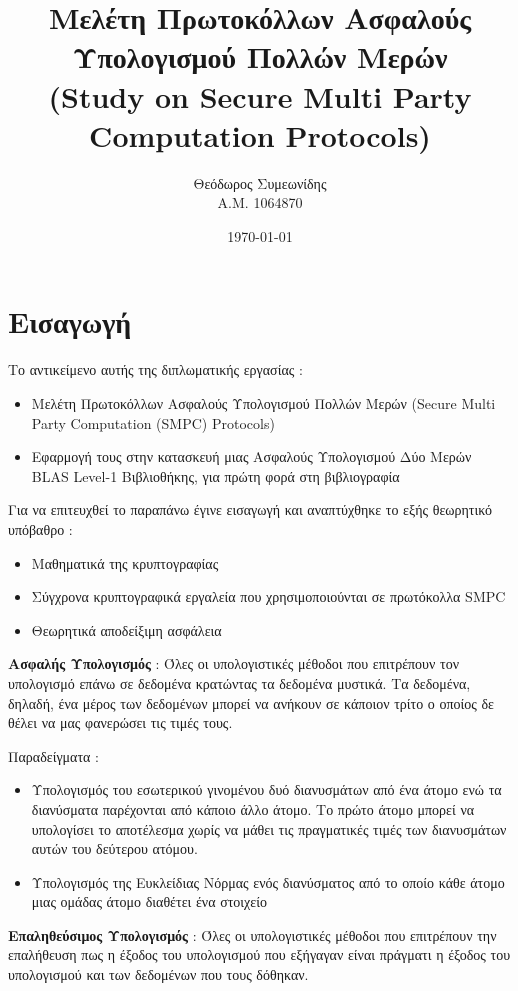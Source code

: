 \documentclass[10pt]{beamer}
\title[Μελέτη Πρωτοκόλλων Ασφαλούς Υπολογισμού Πολλών Μερών]{Μελέτη Πρωτοκόλλων Ασφαλούς Υπολογισμού Πολλών Μερών \\ (Study on Secure Multi Party Computation Protocols)}%
\author[Θεόδωρος Συμεωνίδης Α.Μ. 1064870]{Θεόδωρος Συμεωνίδης \\ Α.Μ. 1064870}
\institute[]{Τμήμα Μηχανικών Η/Υ και Πληροφορίκής \\ Πανεπιστήμιο Πατρών}
\date[\textcolor{white}{Τμήμα Μηχανικών Η/Υ και Πληροφορικής}]
{\today}
\begin{document}
    \begin{frame}
        \titlepage
    \end{frame}

    \section{Εισαγωγή}
    \begin{frame}
        Το αντικείμενο αυτής της διπλωματικής εργασίας :
        \begin{itemize}
            \item Μελέτη Πρωτοκόλλων Ασφαλούς Υπολογισμού Πολλών Μερών (Secure Multi Party Computation (SMPC) Protocols)
            \item Εφαρμογή τους στην κατασκευή μιας Ασφαλούς Υπολογισμού Δύο Μερών BLAS Level-1 Βιβλιοθήκης, για πρώτη φορά στη βιβλιογραφία
        \end{itemize}
        Για να επιτευχθεί το παραπάνω έγινε εισαγωγή και αναπτύχθηκε το εξής θεωρητικό υπόβαθρο :
        \begin{itemize}
            \item Μαθηματικά της κρυπτογραφίας
            \item Σύγχρονα κρυπτογραφικά εργαλεία που χρησιμοποιούνται σε πρωτόκολλα SMPC
            \item Θεωρητικά αποδείξιμη ασφάλεια
        \end{itemize}
    \end{frame}

    \begin{frame}
        \begin{theorem}
            \textbf{Ασφαλής Υπολογισμός} : Όλες οι υπολογιστικές μέθοδοι που επιτρέπουν τον υπολογισμό επάνω σε δεδομένα κρατώντας τα δεδομένα μυστικά. Τα δεδομένα, δηλαδή, ένα μέρος των δεδομένων μπορεί να ανήκουν σε κάποιον τρίτο ο οποίος δε θέλει να μας φανερώσει τις τιμές τους.
            \end{theorem}
            Παραδείγματα :
            \begin{itemize}
                \item Υπολογισμός του εσωτερικού γινομένου δυό διανυσμάτων από ένα άτομο ενώ τα διανύσματα παρέχονται από κάποιο άλλο άτομο. Το πρώτο άτομο μπορεί να υπολογίσει το αποτέλεσμα χωρίς να μάθει τις πραγματικές τιμές των διανυσμάτων αυτών του δεύτερου ατόμου.
                \item Υπολογισμός της Ευκλείδιας Νόρμας ενός διανύσματος από το οποίο κάθε άτομο μιας ομάδας άτομο διαθέτει ένα στοιχείο
            \end{itemize}
            \begin{theorem}
                \textbf{Επαληθεύσιμος Υπολογισμός} : Όλες οι υπολογιστικές μέθοδοι που επιτρέπουν την επαλήθευση πως η έξοδος του υπολογισμού που εξήγαγαν είναι πράγματι η έξοδος του υπολογισμού και των δεδομένων που τους δόθηκαν.
            \end{theorem}
    \end{frame}
\end{document}
